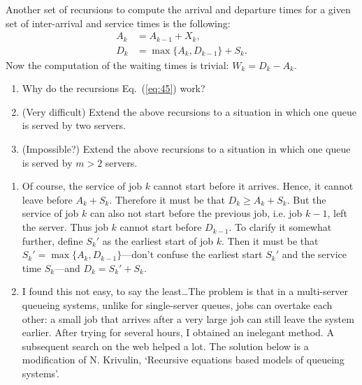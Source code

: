 \begin{question}  Another set of recursions to compute the arrival and departure times
  for a given set of inter-arrival and service times is the following:
\begin{equation}
  \label{eq:45}
  \begin{split}
    A_k &= A_{k-1} + X_k, \\
    D_k &= \max\{A_k, D_{k-1}\} + S_k.
  \end{split}
\end{equation}
Now the computation of the waiting times is trivial:
$W_k = D_k - A_k$.
  \begin{enumerate}
  \item Why do the recursions Eq.~(\ref{eq:45}) work? 
  \item  (Very difficult) Extend the above recursions to a situation in which one queue is
  served by two servers.  
\item (Impossible?)  Extend the above recursions to a situation in
  which one queue is served by $m>2$ servers.
  \end{enumerate}
  \begin{solution}
    \begin{enumerate}
    \item Of course, the service of job $k$ cannot start before it
      arrives. Hence, it cannot leave before $A_k + S_k$. Therefore it
      must be that $D_k \geq A_k +S_k$. But the service of job $k$ can
      also not start before the previous job, i.e. job $k-1$, left the
      server. Thus job $k$ cannot start before $D_{k-1}$. To clarify
      it somewhat further, define $S_k'$ as the earliest start of job
      $k$. Then it must be that $S_k' = \max\{A_k, D_{k-1}\}$---don't
      confuse the earliest start $S_k'$ and the service time
      $S_k$---and $D_k = S_k' + S_k$.
    \item I found this not easy, to say the least\ldots The problem is
      that in a multi-server queueing systems, unlike for
      single-server queues, jobs can overtake each other: a small job
      that arrives after a very large job can still leave the system
      earlier. After trying for several hours, I obtained an inelegant
      method. A subsequent search on the web helped a lot. The
      solution below is a modification of N. Krivulin, `Recursive
      equations based models of queueing systems'. 


\end{enumerate}
\end{solution}
\end{question}
